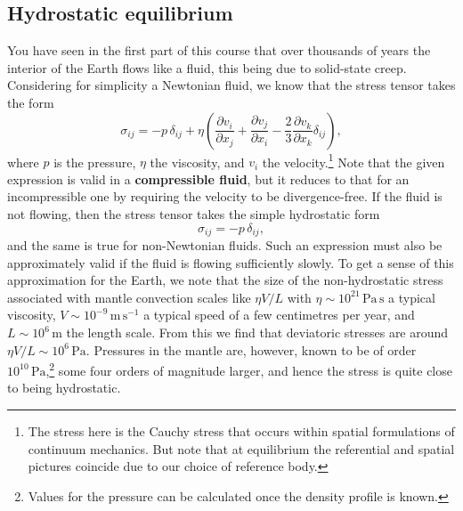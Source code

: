 \subsection*{Hydrostatic equilibrium}
You have seen in the first part of this course that over thousands of years the interior of the Earth flows 
like a fluid, this being due to solid-state creep. Considering for simplicity a Newtonian fluid, we know that the 
stress tensor takes the form
\begin{equation}
\sigma_{ij}=-p\,\delta_{ij}+\eta\left(\frac{\partial v_{i}}{\partial x_{j}}+\frac{\partial v_{j}}{\partial x_{i}}-\frac{2}{3}\frac{\partial v_{k}}{\partial x_{k}}\delta_{ij}\right),
\label{eq:3}
\end{equation}
where $p$ is the pressure, $\eta$ the viscosity, and $v_{i}$ the velocity.\footnote{The stress here is the Cauchy stress that occurs within spatial formulations of continuum mechanics. But note that 
at equilibrium the referential and spatial pictures coincide due to our choice of reference body.} Note that the given expression is valid in a 
\textbf{compressible fluid}, but it reduces to that for an incompressible one by requiring the velocity to be divergence-free. 
If the fluid is not flowing, then the stress tensor takes the simple hydrostatic form
\begin{equation}
\sigma_{ij}=-p\,\delta_{ij},
\label{eq:4}
\end{equation}
and the same is true for non-Newtonian fluids. Such an expression must also be approximately valid if the fluid is flowing 
sufficiently slowly. To get a sense of this approximation for the Earth, we note that the size of the non-hydrostatic 
stress associated with mantle convection scales like $\eta V/L$ with $\eta\sim10^{21}\,\mathrm{Pa\,s}$ a typical viscosity, $V\sim10^{-9}\,\mathrm{m\,s^{-1}}$ a 
typical speed of a few centimetres per year, and $L\sim10^{6}\,\mathrm{m}$ the length scale. From this we find that deviatoric stresses are 
around $\eta V/L\sim10^{6}\,\mathrm{Pa}$. Pressures in the mantle are, however, known to be of order $10^{10}\,\mathrm{Pa}$,\footnote{Values for the 
pressure can be calculated once the density profile is known.} some four orders of magnitude larger, and hence the stress is quite close to being hydrostatic.

